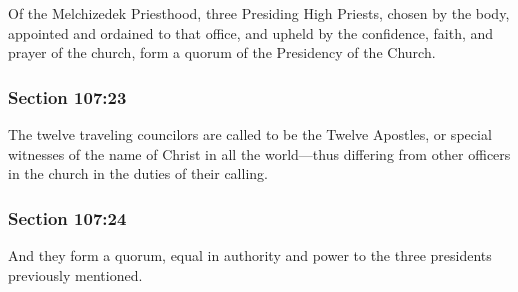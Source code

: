 		Of the Melchizedek Priesthood, three Presiding High Priests, chosen by the body, appointed and ordained to that office, and upheld by the confidence, faith, and prayer of the church, form a quorum of the Presidency of the Church.


	\subsubsection{Section 107:23} %
		\label{DC107-23}

		The twelve traveling councilors are called to be the Twelve Apostles, or special witnesses of the name of Christ in all the world---thus differing from other officers in the church in the duties of their calling.


	\subsubsection{Section 107:24} %
		\label{DC107-24}

		And they form a quorum, equal in authority and power to the three presidents previously mentioned.


